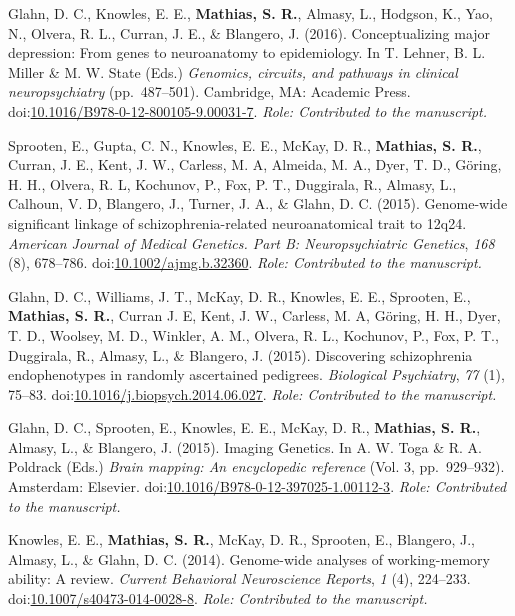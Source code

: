 \documentclass[10pt]{article}
\makeatletter
\newlength{\bibhang}
\newlength{\bibsep}
 {\@listi \global\bibsep\itemsep \global\advance\bibsep by\parsep}
\newenvironment{bibsection}%
        {\vspace{-\baselineskip}\begin{list}{}{%
       \setlength{\leftmargin}{\bibhang}%
       \setlength{\itemindent}{-\leftmargin}%
       \setlength{\itemsep}{\bibsep}%
       \setlength{\parsep}{\z@}%
        \setlength{\partopsep}{0pt}%
        \setlength{\topsep}{0pt}}}
        {\end{list}\vspace{-.6\baselineskip}}
\newcommand\doilink[1]{\href{http://dx.doi.org/#1}{#1}}
\newcommand\doi[1]{doi:\doilink{#1}}
\makeatother
\begin{document}
\begin{bibsection}
\item Glahn, D. C., Knowles, E. E., \textbf{Mathias, S. R.}, Almasy, L., Hodgson, K., Yao, N., Olvera, R. L., Curran, J. E., \& Blangero, J. (2016). Conceptualizing major depression: From genes to neuroanatomy to epidemiology. In T. Lehner, B. L. Miller \& M. W. State (Eds.) \emph{Genomics, circuits, and pathways in clinical neuropsychiatry} (pp.~487--501). Cambridge, MA: Academic Press. \doi{10.1016/B978-0-12-800105-9.00031-7}. \emph{Role: Contributed to the manuscript.}

\item Sprooten, E., Gupta, C. N., Knowles, E. E., McKay, D. R., \textbf{Mathias, S. R.}, Curran, J. E., Kent, J. W., Carless, M. A,  Almeida, M. A., Dyer, T. D., G\"{o}ring, H. H., Olvera, R. L, Kochunov, P., Fox, P. T., Duggirala, R., Almasy, L., Calhoun, V. D, Blangero, J., Turner, J. A., \& Glahn, D. C. (2015). Genome-wide significant linkage of schizophrenia-related neuroanatomical trait to 12q24. \emph{American Journal of Medical Genetics. Part B: Neuropsychiatric Genetics}, \emph{168} (8), 678--786. \doi{10.1002/ajmg.b.32360}.  \emph{Role: Contributed to the manuscript.}

\item Glahn, D. C., Williams, J. T., McKay, D. R., Knowles, E. E., Sprooten, E., \textbf{Mathias, S. R.}, Curran J. E, Kent, J. W., Carless, M. A, G\"{o}ring, H. H., Dyer, T. D., Woolsey, M. D., Winkler, A. M., Olvera, R. L., Kochunov, P., Fox, P. T., Duggirala, R., Almasy, L., \& Blangero, J. (2015). Discovering schizophrenia endophenotypes in randomly ascertained pedigrees. \emph{Biological Psychiatry}, \emph{77} (1), 75--83. \doi{10.1016/j.biopsych.2014.06.027}. \emph{Role: Contributed to the manuscript.}

\item Glahn, D. C., Sprooten, E., Knowles, E. E., McKay, D. R., \textbf{Mathias, S. R.}, Almasy, L., \& Blangero, J. (2015). Imaging Genetics. In A. W. Toga \& R. A. Poldrack (Eds.) \emph{Brain mapping: An encyclopedic reference} (Vol. 3, pp.~929--932). Amsterdam: Elsevier. \doi{10.1016/B978-0-12-397025-1.00112-3}.  \emph{Role: Contributed to the manuscript.}

\item Knowles, E. E., \textbf{Mathias, S. R.}, McKay, D. R., Sprooten, E., Blangero, J., Almasy, L., \& Glahn, D. C. (2014). Genome-wide analyses of working-memory ability: A review. \emph{Current Behavioral Neuroscience Reports}, \emph{1} (4), 224--233. \doi{10.1007/s40473-014-0028-8}.  \emph{Role: Contributed to the manuscript.}


\end{bibsection}
\end{document}
